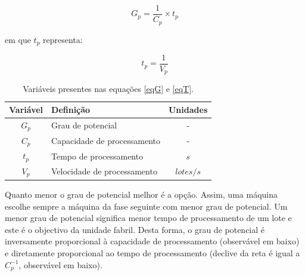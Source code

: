 \begin{titlepage}
\begin{equation}
G_{p}=\frac{1}{C_{p}}\times t_{p}
\label{eqG}
\end{equation}

em que $t_{p}$ representa: 

\begin{equation}
t_{p}=\frac{1}{V_{p}}
\label{eqT}
\end{equation}

\begin{table}[H]
\centering
\caption{Variáveis presentes nas equações \ref{eqG} e \ref{eqT}.}
\label{my-label}
\begin{tabular}{@{}p{2cm}ll@{}}
\toprule
\multicolumn{1}{c}{\textbf{Variável}} & \textbf{Definição}   & \multicolumn{1}{c}{\textbf{Unidades}} \\ \midrule
\multicolumn{1}{c}{$G_{p}$} & Grau de potencial &  \multicolumn{1}{c}{-}  \\ \midrule
\multicolumn{1}{c}{$C_{p}$} & Capacidade de processamento &  \multicolumn{1}{c}{-}  \\ \midrule
\multicolumn{1}{c}{$t_{p}$} & Tempo de processamento      & \multicolumn{1}{c}{$s$} \\ \midrule
\multicolumn{1}{c}{$V_{p}$} & Velocidade de processamento  & \multicolumn{1}{c}{$lotes/s$} \\ \bottomrule
\end{tabular}
\end{table}

Quanto menor o grau de potencial melhor é a opção. Assim, uma máquina escolhe sempre a máquina da fase seguinte com menor grau de potencial. Um menor grau de potencial significa menor tempo de processamento de um lote e este é o objectivo da unidade fabril. Desta forma, o grau de potencial é inversamente proporcional à capacidade de processamento (observável em baixo) e diretamente proporcional ao tempo de processamento (declive da reta é igual a $C_{p}^{-1}$, observável em baixo).


  

\end{titlepage}
